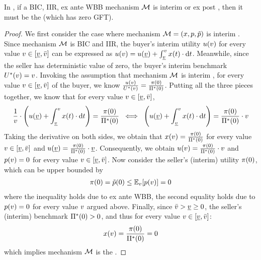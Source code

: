 \begin{lemma}
\label{prop:interim/ex post fairness:no trade}
    In , if a BIC, IIR, ex ante WBB mechanism $\mathcal{M}$ is interim {\ksfair} or ex post {\ksfair}, then it must be the {\NoTrade} (which has zero GFT). 
\end{lemma}
\begin{proof}
    We first consider the case where mechanism $\mathcal{M} = (x,p,\tilde{p})$ is interim {\ksfair}. 
    Since mechanism $\mathcal{M}$ is BIC and IIR, the buyer's interim utility $u(v)$ for every value $v\in[\underline{v},\bar{v}]$ can be expressed as 
    $u(v) = u(\underline{v}) + \int_{\underline{v}}^v x(t)\cdot \mathrm{d} t$.
    Meanwhile, since the seller has deterministic value of zero, the buyer's interim benchmark $U^*(v) = v$.
    Invoking the assumption that mechanism $\mathcal{M}$ is interim {\ksfair}, for every value $v\in[\underline{v},\bar{v}]$ of the buyer, we know 
    $\frac{u(v)}{U^*(v)}
        =
        \frac{\pi(0)}{\Pi^*(0)}$.
    Putting all the three pieces together, we know that for every value $v\in[\underline{v},\bar{v}]$,
    \begin{align*}
        \frac{1}{v}\cdot \left(u(\underline{v}) + \displaystyle\int_{\underline{v}}^v x(t)\cdot \mathrm{d} t \right)= 
        \frac{\pi(0)}{\Pi^*(0)} 
        \;\;
        \Longleftrightarrow
        \;\;
        \left(u(\underline{v}) + \displaystyle\int_{\underline{v}}^v x(t)\cdot \mathrm{d} t \right)= 
        \frac{\pi(0)}{\Pi^*(0)} 
        \cdot v
    \end{align*}
    Taking the derivative on both sides, we obtain that 
    $x(v) = \frac{\pi(0)}{\Pi^*(0)}$ for every value $v\in[\underline{v},\bar{v}]$ and $u(\underline{v}) = \frac{\pi(0)}{\Pi^*(0)}\cdot \underline{v}$.
    Consequently, we obtain $u(v) = \frac{\pi(0)}{\Pi^*(0)}\cdot v$ and $p(v) = 0$ for every value $v\in[\underline{v},\bar{v}]$.
    Now consider the seller's (interim) utility $\pi(0)$, which can be upper bounded by
    \begin{align*}
        \sellerutil(0) = \sellerprice(0)\leq \expect[\val]{\price(\val)} 
        = 0
    \end{align*}
    where the inequality holds due to ex ante WBB, the second equality holds due to $p(v) = 0$ for every value $v$ argued above.
    Finally, since $\bar{v} > \underline{v} \geq 0$, the seller's (interim) benchmark $\Pi^*(0) > 0$, and thus for every value $v \in[\underline{v}, \bar{v}]$:
    \begin{align*}
        x(v) = \frac{\pi(0)}{\Pi^*(0)} = 0 
    \end{align*}
    which implies mechanism $\mathcal{M}$ is the {\NoTrade}.
    

\end{proof}

